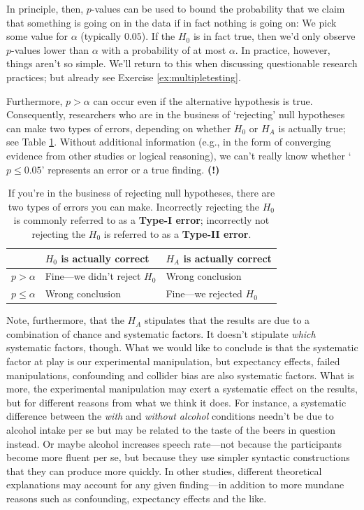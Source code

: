 \documentclass[a4paper]{tufte-book}\usepackage[]{graphicx}\usepackage[]{xcolor}
\begin{document}
In principle, then, $p$-values can be used to bound the probability 
that we claim that something is going on in the data if in fact nothing is going on:
We pick some value for $\alpha$ (typically $0.05$).
If the $H_0$ is in fact true, then we'd only observe $p$-values lower than
$\alpha$ with a probability of at most $\alpha$.
In practice, however, things aren't so simple.
We'll return to this when discussing questionable research practices;
but already see Exercise \ref{ex:multipletesting}.

Furthermore, $p>\alpha$ can occur even
if the alternative hypothesis is true.
Consequently,
researchers who are in the business of `rejecting' null hypotheses
can make two types of errors, depending on whether $H_0$ or $H_A$ is actually true;
see Table \ref{tab:errors}.
Without additional information (e.g., in the form of converging evidence
from other studies or logical reasoning), we can't really know whether
`$p \leq 0.05$' represents an error or a true finding. \textbf{(!)}

\begin{table}[h]
\caption{If you're in the business of rejecting null hypotheses, there are two types of errors you can make.
Incorrectly rejecting the $H_0$ is commonly referred to as a \textbf{Type-I error};
incorrectly not rejecting the $H_0$ is referred to as a \textbf{Type-II error}.}
\centering
\begin{tabular}{@{}lll@{}}
\toprule
                            & $H_0$ is actually correct       & $H_A$ is actually correct \\ \midrule
$p > \alpha$                  & Fine---we didn't reject $H_0$   & Wrong conclusion  \\
$p \leq \alpha$               & Wrong conclusion                & Fine---we rejected $H_0$ \\
\bottomrule
\end{tabular}
\label{tab:errors}
\end{table}

\medskip

Note, furthermore, that the $H_A$ stipulates that the results are
due to a combination of chance and systematic factors.
It doesn't stipulate \emph{which} systematic factors, though.
What we would like to conclude is that the systematic factor
at play is our experimental manipulation,
but expectancy effects, failed manipulations, confounding and collider bias
are also systematic factors.
What is more, the experimental manipulation may exert a systematic
effect on the results, but for different reasons from what we think it does.
For instance, a systematic difference between the
\textit{with} and \textit{without alcohol} conditions needn't be due to alcohol intake per se but
may be related to the taste of the beers in question instead.
Or maybe alcohol increases speech rate---not because the participants
become more fluent per se, but because they use simpler syntactic
constructions that they can produce more quickly.
In other studies, different theoretical explanations 
may account for any given finding---in addition to more mundane reasons such as confounding, expectancy effects and the like.
\end{document}
